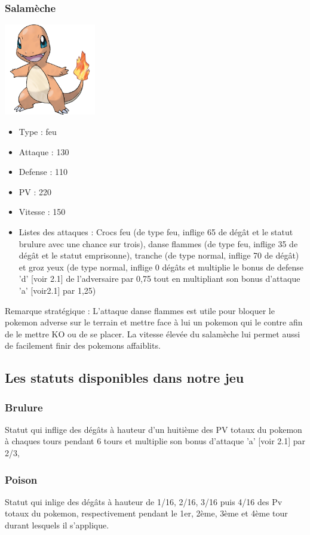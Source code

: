 		\subsubsection{Salamèche}
			\begin{center}
				\includegraphics[width=4cm,height=4cm]{images/salameche}
			\end{center}
			\begin{itemize}
				\item Type : feu
				\item Attaque : 130
				\item Defense : 110
				\item PV : 220
				\item Vitesse : 150
				\item Listes des attaques : Crocs feu (de type feu, inflige 65 de dégât et le statut brulure avec une chance sur trois), danse flammes (de type feu, inflige 35 de dégât et le statut emprisonne), tranche (de type normal, inflige 70 de dégât) et groz yeux (de type normal, inflige 0 dégâts et multiplie le bonus de defense 'd' [voir 2.1] de l'adversaire par 0,75 tout en multipliant son bonus d'attaque 'a' [voir2.1] par 1,25)
			\end{itemize}
			Remarque stratégique : L'attaque danse flammes est utile pour bloquer le pokemon adverse sur le terrain et mettre face à lui un pokemon qui le contre afin de le mettre KO ou de se placer. La vitesse élevée du salamèche lui permet aussi de facilement finir des pokemons affaiblits.
	\subsection{Les statuts disponibles dans notre jeu}
		\subsubsection{Brulure}
			Statut qui inflige des dégâts à hauteur d'un huitième des PV totaux du pokemon à chaques tours pendant 6 tours et multiplie son bonus d'attaque 'a' [voir 2.1] par 2/3,
		\subsubsection{Poison}
            Statut qui inlige des dégâts à hauteur de 1/16, 2/16, 3/16 puis 4/16 des Pv totaux du pokemon, respectivement pendant le 1er, 2ème, 3ème et 4ème tour durant lesquels il s'applique.
